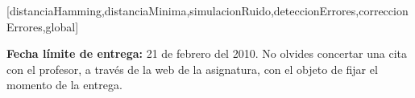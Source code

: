 \documentclass[11pt,heading,asymmetric,practice]{uniexer}
\begin{document}


[distanciaHamming,distanciaMinima,simulacionRuido,deteccionErrores,correccionErrores,global]






\vspace*{2em}


\noindent \textbf{Fecha l\'imite de entrega:}  21 de febrero del 2010.
No olvides concertar una cita con el profesor, a través de  la web de la 
asignatura, con el objeto de fijar el momento de la entrega.
\end{document}
